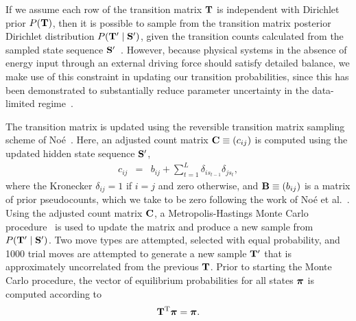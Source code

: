 \documentclass[aps,pre,twocolumn,superscriptaddress,nofootinbib,longbibliography]{revtex4-1}
\newcommand{\bfv}[1]{{\mbox{\boldmath{$#1$}}}}
\newcommand{\bfm}[1]{{\bf #1}}
\newcommand{\T}{\mathrm{T}}                                %
\begin{document}
{%
{\color{red} If we assume each row of the transition matrix $\bfm{T}$ is independent with Dirichlet prior $P(\bfm{T})$, then it is possible to sample from the transition matrix posterior Dirichlet distribution $P(\bfm{T}' \mid \bfm{S}')$, given the transition counts calculated from the sampled state sequence $\bfm{S}'$~\cite{noe:jcp:2008:transition-matrix-sampling}.}
However, because physical systems in the absence of energy input through an external driving force should satisfy detailed balance, we make use of this constraint in updating our transition probabilities, since this has been demonstrated to substantially reduce parameter uncertainty in the data-limited regime~\cite{noe:jcp:2008:transition-matrix-sampling}.

The transition matrix is updated using the reversible transition matrix sampling scheme of No\'{e}~\cite{noe:jcp:2008:transition-matrix-sampling,chodera-noe:jcp:2011:observable-sampling}.
Here, an adjusted count matrix $\bfm{C} \equiv (c_{ij})$ is computed using the updated hidden state sequence $\bfm{S}'$,
\begin{eqnarray}
c_{ij} &=& b_{ij} +\sum_{t=1}^{L} \delta_{is_{t-1}} \delta_{js_{t}} ,
\end{eqnarray}
where the Kronecker $\delta_{ij} = 1$ if $i = j$ and zero otherwise, and $\bfm{B} \equiv (b_{ij})$ is a matrix of prior pseudocounts, which we take to be zero following the work of No\'{e} et al.~\cite{noe:pnas:2009:ww-domain}.
Using the adjusted count matrix $\bfm{C}$, a Metropolis-Hastings Monte Carlo procedure~\cite{metropolis-hastings} is used to update the matrix and produce a new sample from $P(\bfm{T}' \mid \bfm{S}')$.
Two move types are attempted, selected with equal probability, and 1000 trial moves are attempted to generate a new sample $\bfm{T}'$ that is approximately uncorrelated from the previous $\bfm{T}$.
Prior to starting the Monte Carlo procedure, the vector of equilibrium probabilities for all states $\bfv{\pi}$ is computed according to 
\begin{eqnarray}
\bfm{T}^\T \bfv{\pi} = \bfv{\pi} .
\end{eqnarray}

}
\end{document}
